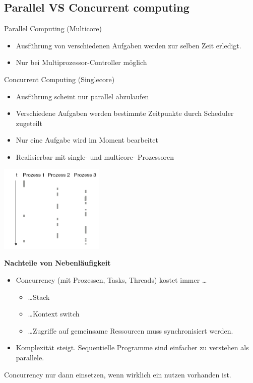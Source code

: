 \subsection{Parallel VS Concurrent computing}
\begin{multicols}{2}
  Parallel Computing (Multicore)
  \begin{itemize}
    \item Ausf\"uhrung von verschiedenen Aufgaben werden zur selben Zeit erledigt.
    \item Nur bei Multiprozessor-Controller m\"oglich
  \end{itemize}
\vfill\null
\columnbreak
  Concurrent Computing (Singlecore)
  \begin{itemize}
    \item Ausf\"uhrung scheint nur parallel abzulaufen
    \item Verschiedene Aufgaben werden bestimmte Zeitpunkte durch Scheduler zugeteilt
    \item Nur eine Aufgabe wird im Moment bearbeitet
    \item Realisierbar mit single- und multicore- Prozessoren
  \end{itemize}
  \includegraphics[width=5cm]{images/Concurrency/Quasiparallelitaet.png}
\end{multicols}

\textbf{Nachteile von Nebenläufigkeit}
\begin{itemize}
  \item  Concurrency (mit Prozessen, Tasks, Threads) kostet immer \ldots
  \begin{itemize}
    \item \ldots Stack
    \item \ldots Kontext switch
    \item \ldots Zugriffe auf gemeinsame Ressourcen muss synchronisiert werden.
  \end{itemize}
  \item  Komplexität steigt. Sequentielle Programme sind einfacher zu verstehen als parallele.
\end{itemize}
Concurrency nur dann einsetzen, wenn wirklich ein nutzen vorhanden ist.

